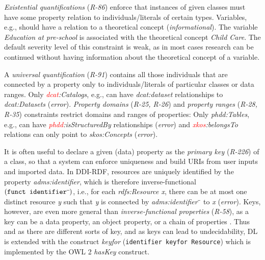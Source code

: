 \documentclass[conference]{IEEEtran}
\newcommand{\ms}[1]{\texttt{#1}}
\newenvironment{DL}{
  \small
  \vspace{0cm}
	\begin{center}
  \begin{tabular}{c l}

}{
  \end{tabular}
	\end{center}
}
\begin{document}
\emph{Existential quantifications} (\emph{R-86}) enforce that instances of given classes must have some property relation to individuals/literals of certain types.
Variables, e.g., should have a relation to a theoretical concept (\emph{informational}).
The variable \emph{Education at pre-school} is associated with the theoretical concept \emph{Child Care}. 
The default severity level of this constraint is weak, as in most cases research can be continued without having information about the theoretical concept of a variable.

A \emph{universal quantification} (\emph{R-91}) contains all those individuals that are connected by a property only to individuals/literals of particular classes  or data ranges.
Only \emph{\textcolor{red}{dcat}:Catalogs}, e.g., can have \emph{dcat:dataset} relationships to \emph{dcat:Datasets} (\emph{error}).
\emph{Property domains} (\emph{R-25, R-26}) and \emph{property ranges} (\emph{R-28, R-35}) constraints restrict domains and ranges of properties:
Only \emph{phdd:Tables}, e.g., can have \emph{\textcolor{red}{phdd}:isStructuredBy} relationships (\emph{error}) and \emph{\textcolor{red}{xkos}:belongsTo} relations can only point to \emph{skos:Concepts} (\emph{error}).

It is often useful to declare a given (data) property as the \emph{primary key} (\emph{R-226}) of a class, so that a system can enforce uniqueness and build URIs from user inputs and imported data. 
In DDI-RDF, resources are uniquely identified by the property \emph{adms:identifier},
which is therefore inverse-functional $({\small\ms{funct identifier}\sp{\overline{\ }}})$,
i.e., for each \emph{rdfs:Resource x}, there can be at most one distinct resource \emph{y} such that \emph{y} is connected by \emph{adms:identifier$\sp{\overline{\ }}$} to \emph{x} (\emph{error}).
Keys, however, are even more general than \emph{inverse-functional properties} (\emph{R-58}),
as a key can be a data property, an object property, or a chain of properties \cite{Schneider2009}.
Thus and as there are different sorts of key, and as keys can lead to undecidability, 
DL is extended with the construct \emph{keyfor} ({\small\ms{identifier \ms{keyfor} Resource}}) \cite{Lutz2005} which is implemented by the OWL 2 \emph{hasKey} construct.
\end{document}
